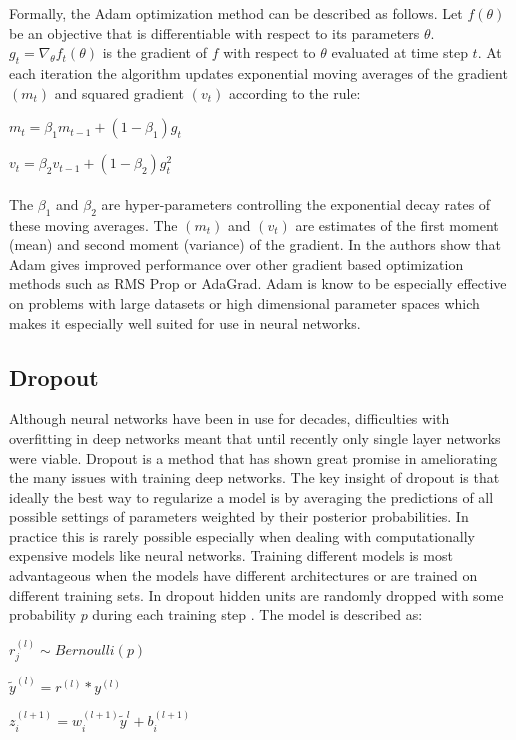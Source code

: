 \documentclass[12pt,letterpaper]{article}
\begin{document}
Formally, the Adam optimization method can be described as follows.  Let $f(\theta)$ be an objective that is differentiable with respect to its parameters $\theta$.  $g_t = \nabla_{\theta}f_t(\theta)$ is the gradient of $f$ with respect to $\theta$ evaluated at time step $t$.   At each iteration the algorithm updates exponential moving averages of the gradient $(m_t)$ and squared gradient $(v_t)$ according to the rule:

$m_t = \beta_1 m_{t-1} + (1 - \beta_1) g_t$

$v_t = \beta_2 v_{t-1} + (1 - \beta_2) g_t^2$
\\
\\
The $\beta_1$ and $\beta_2$ are hyper-parameters controlling the exponential decay rates of these moving averages.  The $(m_t)$ and  $(v_t)$ are estimates of the first moment (mean) and second moment (variance) of the gradient. In \cite{journals/corr/KingmaB14} the authors show that Adam gives improved performance over other gradient based optimization methods such as RMS Prop or AdaGrad.  Adam is know to be especially effective on problems with large datasets or high dimensional parameter spaces which makes it especially well suited for use in neural networks.

\subsection{Dropout}
Although neural networks have been in use for decades, difficulties with overfitting in deep networks meant that until recently only single layer networks were viable.  Dropout is a method that has shown great promise in ameliorating the many issues with training deep networks.  The key insight of dropout is that ideally the best way to regularize a model is by averaging the predictions of all possible settings of parameters weighted by their posterior probabilities. In practice this is rarely possible especially when dealing with computationally expensive models like neural networks.  Training different models is most advantageous when the models have different architectures or are trained on different training sets. In dropout hidden units are randomly dropped with some probability $p$ during each training step \cite{Srivastava:2014:DSW:2627435.2670313}.  The model is described as:


$r_j^{(l)} \sim Bernoulli(p)$

$\tilde{y}^{(l)} = r^{(l)} * y^{(l)}$

$z_i^{(l + 1)} = w_i^{(l + 1)}\tilde{y}^l + b_i^{(l + 1)}$
\end{document}
